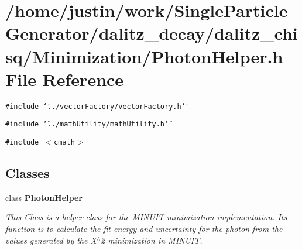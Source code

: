\section{/home/justin/work/Single\-Particle\-Generator/dalitz\_\-decay/dalitz\_\-chisq/Minimization/Photon\-Helper.h File Reference}
\label{PhotonHelper_8h}
{\tt \#include \char`\"{}../vector\-Factory/vector\-Factory.h\char`\"{}}\par
{\tt \#include \char`\"{}../math\-Utility/math\-Utility.h\char`\"{}}\par
{\tt \#include $<$cmath$>$}\par
\subsection*{Classes}
\begin{CompactItemize}
\item 
class \bf{Photon\-Helper}
\begin{CompactList}\small\item\em This Class is a helper class for the MINUIT minimization implementation. Its function is to calculate the fit energy and uncertainty for the photon from the values generated by the X$^\wedge$2 minimization in MINUIT. \item\end{CompactList}\end{CompactItemize}
